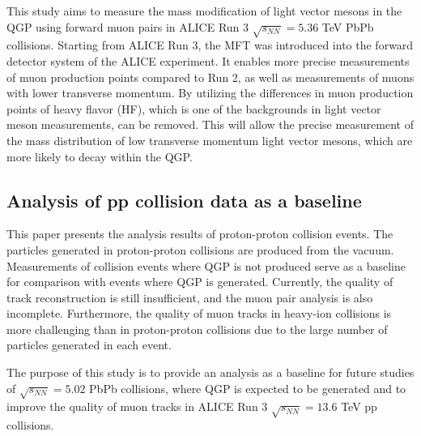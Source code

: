         This study aims to measure the mass modification of light vector mesons in the QGP using forward muon pairs in ALICE Run 3 $\sqrt{s_{NN}} = 5.36$ TeV PbPb collisions. Starting from ALICE Run 3, the MFT was introduced into the forward detector system of the ALICE experiment. It enables more precise measurements of muon production points compared to Run 2, as well as measurements of muons with lower transverse momentum. By utilizing the differences in muon production points of heavy flavor (HF), which is one of the backgrounds in light vector meson measurements, can be removed. This will allow the precise measurement of the mass distribution of low transverse momentum light vector mesons, which are more likely to decay within the QGP.
    \subsection{Analysis of pp collision data as a baseline}
    This paper presents the analysis results of proton-proton collision events. The particles generated in proton-proton collisions are produced from the vacuum. Measurements of collision events where QGP is not produced serve as a baseline for comparison with events where QGP is generated. Currently, the quality of track reconstruction is still insufficient, and the muon pair analysis is also incomplete. Furthermore, the quality of muon tracks in heavy-ion collisions is more challenging than in proton-proton collisions due to the large number of particles generated in each event.  

    The purpose of this study is to provide an analysis as a baseline for future studies of $\sqrt{s_{NN}} = 5.02$ PbPb collisions, where QGP is expected to be generated and to improve the quality of muon tracks in ALICE Run 3 $\sqrt{s_{NN}} = 13.6$ TeV pp collisions.